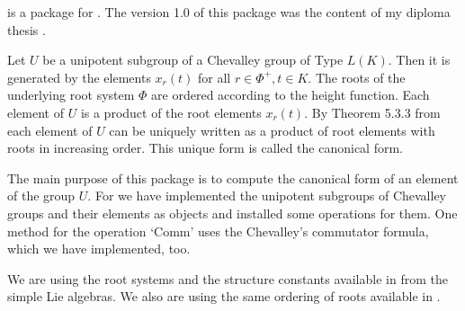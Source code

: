 

{\Unipot} is a package for {} \cite{GAP4}. The  version 1.0
of   this  package  was   the  content  of  my  diploma   thesis
\cite{SH2000}.

Let $U$ be a unipotent  subgroup of  a  Chevalley  group of Type
$L(K)$.  Then it is generated by  the  elements $x_r(t)$ for all
$r\in  \Phi^+,t\in K$. The roots of the underlying  root  system
$\Phi$  are  ordered  according  to  the height  function.  Each
element of  $U$ is  a product of the  root elements $x_r(t)$. By
Theorem 5.3.3 from  \cite{Carter72}  each element of $U$ can  be
uniquely  written  as a product  of root  elements with roots in
increasing order. This unique form is called the canonical form.


The main  purpose  of this  package is to compute the  canonical
form of an element of the group $U$. For we have implemented the
unipotent subgroups  of Chevalley groups and  their elements  as
{\GAP} objects and  installed  some  operations  for  them.  One
method for the operation `Comm'  uses the Chevalley's commutator
formula, which we have implemented, too.



We  are  using  the  root  systems and  the  structure constants
available in {\GAP} from  the simple  Lie algebras. We  also are
using the same ordering of roots available in {\GAP}.


% 


